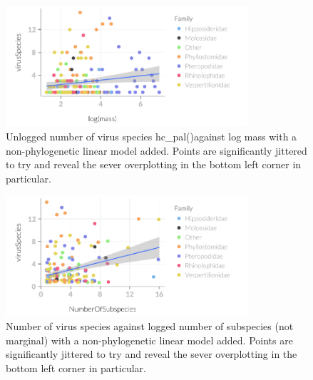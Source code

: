 \begin{knitrout}\footnotesize
{}\color{fgcolor}\begin{figure}[t]

{\centering \includegraphics[width=0.8\textwidth]{figure/subsDataviz-1} 

}

\caption[Unlogged number of virus species hc_pal()against log mass with a non-phylogenetic linear model added]{Unlogged number of virus species hc_pal()against log mass with a non-phylogenetic linear model added. Points are significantly jittered to try and reveal the sever overplotting in the bottom left corner in particular.}\label{fig:subsDataviz}
\end{figure}

\begin{figure}[t]

{\centering \includegraphics[width=0.8\textwidth]{figure/subsDataviz-2} 

}

\caption[Number of virus species against logged number of subspecies (not marginal) with a non-phylogenetic linear model added]{Number of virus species against logged number of subspecies (not marginal) with a non-phylogenetic linear model added. Points are significantly jittered to try and reveal the sever overplotting in the bottom left corner in particular.}\label{fig:subsDataviz}
\end{figure}


\end{knitrout}
